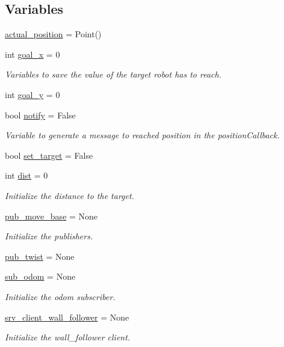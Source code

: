 \subsection*{Variables}
\begin{DoxyCompactItemize}
\item 
\hyperlink{namespacerobot__user__interface_a93557af62ae5a9f9fb406de12d599a58}{actual\+\_\+position} = Point()
\item 
int \hyperlink{namespacerobot__user__interface_aa49c4c4b4c031611deca926a34deb345}{goal\+\_\+x} = 0
\begin{DoxyCompactList}\small\item\em Variables to save the value of the target robot has to reach. \end{DoxyCompactList}\item 
int \hyperlink{namespacerobot__user__interface_aee93dc3e48f178d62b1209aa13232be2}{goal\+\_\+y} = 0
\item 
bool \hyperlink{namespacerobot__user__interface_ab96d4afbc6f7d4bb5019beec53e4615d}{notify} = False
\begin{DoxyCompactList}\small\item\em Variable to generate a message to reached position in the position\+Callback. \end{DoxyCompactList}\item 
bool \hyperlink{namespacerobot__user__interface_ab735683088fe7d67ce16d40c53b3208c}{set\+\_\+target} = False
\item 
int \hyperlink{namespacerobot__user__interface_a57ca0e32cc10313871da599206689de6}{dist} = 0
\begin{DoxyCompactList}\small\item\em Initialize the distance to the target. \end{DoxyCompactList}\item 
\hyperlink{namespacerobot__user__interface_ad8e7e9dc5f614912b17e97229d3bc726}{pub\+\_\+move\+\_\+base} = None
\begin{DoxyCompactList}\small\item\em Initialize the publishers. \end{DoxyCompactList}\item 
\hyperlink{namespacerobot__user__interface_aa95d3e42b12dbcb906f08ec10450e436}{pub\+\_\+twist} = None
\item 
\hyperlink{namespacerobot__user__interface_a18cc77d7f27b808397c9d58367a25280}{sub\+\_\+odom} = None
\begin{DoxyCompactList}\small\item\em Initialize the odom subscriber. \end{DoxyCompactList}\item 
\hyperlink{namespacerobot__user__interface_a95d6798bc3ba3f2e590443ca7ad8d7d4}{srv\+\_\+client\+\_\+wall\+\_\+follower} = None
\begin{DoxyCompactList}\small\item\em Initialize the wall\+\_\+follower client. \end{DoxyCompactList}\end{DoxyCompactItemize}


